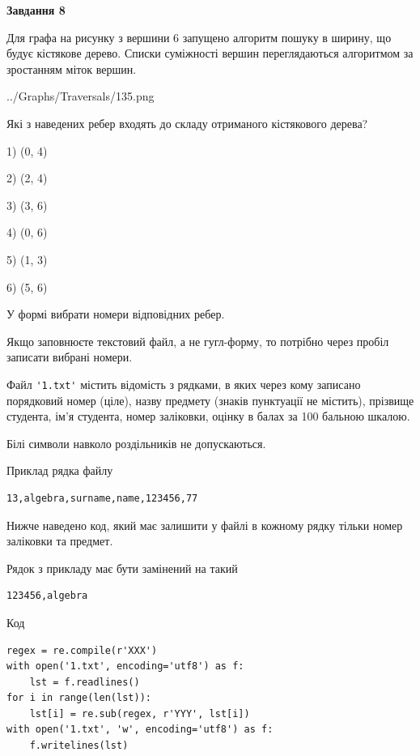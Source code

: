 \documentclass[12pt, ukrainian]{article}
\def\code#1{\Verb!#1!}
\begin{document}
{\begin {large}
{\begin {center}\textbf{Завдання 8}\end {center}}\par
Для графа на рисунку з вершини 6 запущено алгоритм пошуку в ширину, що будує кістякове дерево. Списки суміжності вершин переглядаються алгоритмом за зростанням міток вершин.\par
\begin{center}
	{../Graphs/Traversals/135.png}
\end{center}
\par Які з наведених ребер входять до складу отриманого кістякового дерева?\par
1) (0, 4)\par
2) (2, 4)\par
3) (3, 6)\par
4) (0, 6)\par
5) (1, 3)\par
6) (5, 6)\par
{\vskip 15pt} У формі вибрати номери відповідних ребер.


Якщо заповнюєте текстовий файл, а не гугл-форму, то потрібно через пробіл записа\-ти вибрані номери.\par
\newpage


Файл \code{'1.txt'} містить відомість з рядками, в яких через кому записано поряд\-ковий номер (ціле), назву предмету (знаків пунктуації не містить), прізвище студента, ім'я студента, номер заліковки, оцінку в балах за 100 бальною шкалою.

Білі символи навколо роздільників не допускаються.

Приклад рядка файлу



\begin{verbatim}
13,algebra,surname,name,123456,77
\end{verbatim}


Нижче наведено код, який має залишити у файлі в кожному рядку тільки номер заліковки та предмет.

Рядок з прикладу має бути замінений на такий



\begin{verbatim}
123456,algebra
\end{verbatim}




Код



\begin{verbatim}
regex = re.compile(r'XXX')
with open('1.txt', encoding='utf8') as f:
    lst = f.readlines()
for i in range(len(lst)):
    lst[i] = re.sub(regex, r'YYY', lst[i])
with open('1.txt', 'w', encoding='utf8') as f:
    f.writelines(lst)
\end{verbatim}







\end{large}}
\end{document}
